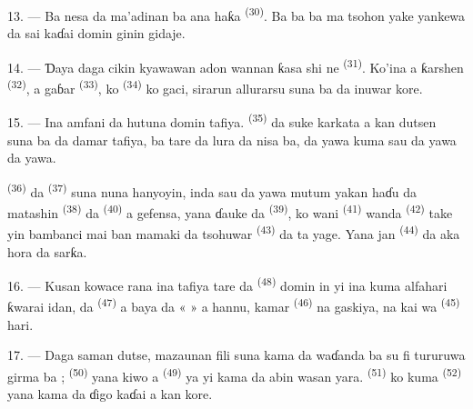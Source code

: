 13. --- Ba nesa da ma’adinan ba ana haƙa 
\textsuperscript{(30)}. Ba  ba  ba ma  tsohon 
yake yankewa da  sai  kaɗai domin ginin gidaje.

14. --- Ɗaya daga cikin kyawawan adon wannan ƙasa shi ne
 \textsuperscript{(31)}. Ko’ina a ƙarshen
 \textsuperscript{(32)}, a gaɓar 
\textsuperscript{(33)}, ko  \textsuperscript{(34)} ko
gaci, sirarun allurarsu suna ba da inuwar kore.

\VUsaut{3.0mm}
\VUsaut{3.0mm}

15. --- Ina amfani da hutuna domin  tafiya.
 \textsuperscript{(35)} da suke karkata a kan dutsen suna
ba da damar tafiya, ba tare da lura da nisa ba,  da
yawa kuma sau da yawa  da yawa.

 \textsuperscript{(36)} da 
\textsuperscript{(37)} suna nuna hanyoyin, inda sau da yawa mutum yakan
haɗu da matashin  \textsuperscript{(38)} da  \textsuperscript{(40)} a gefensa, yana ɗauke da
 \textsuperscript{(39)}, ko wani 
\textsuperscript{(41)} wanda 
\textsuperscript{(42)} take yin bambanci mai ban mamaki da tsohuwar
 \textsuperscript{(43)} da ta yage. Yana jan
 \textsuperscript{(44)} da aka hora da sarƙa.

\VUsaut{3.0mm}

16. --- Kusan kowace rana ina tafiya tare da 
\textsuperscript{(48)} domin in yi  ina kuma
alfahari ƙwarai idan, da  \textsuperscript{(47)} a baya da
«  » a hannu, kamar 
\textsuperscript{(46)} na gaskiya, na kai wa 
\textsuperscript{(45)} hari.

17. --- Daga saman dutse, mazaunan fili suna kama da waɗanda ba su fi
tururuwa girma ba ;  \textsuperscript{(50)} yana
kiwo a  \textsuperscript{(49)} ya yi kama da abin wasan
yara.  \textsuperscript{(51)} ko kuma  \textsuperscript{(52)} yana kama da ɗigo kaɗai a kan
kore.

